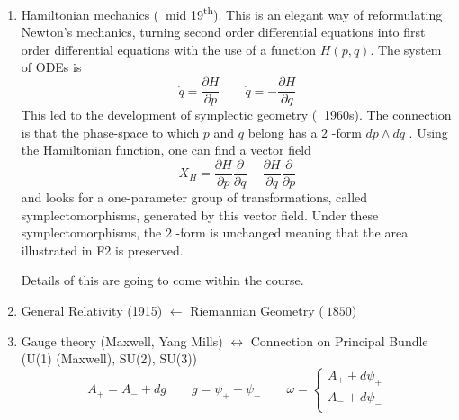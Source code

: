 \begin{enumerate}[1)]
  \item Hamiltonian mechanics ($~$ mid 19\textsuperscript{th}). This is an elegant way of reformulating Newton's mechanics, turning second order differential equations into first order differential equations with the use of a function $H(p, q)$. The system of ODEs is 
    \begin{equation}
      \dot{q} = \frac{\partial H}{\partial p} \qquad \dot{q} = - \frac{\partial H}{\partial q}
    \end{equation}
    This led to the development of symplectic geometry ($~$ 1960s).
    The connection is that the phase-space to which $p$  and $q$  belong has a $2$ -form $dp \wedge dq$ .
    Using the Hamiltonian function, one can find a vector field 
    \begin{equation}
      X_H = \frac{\partial H}{\partial p} \frac{\partial }{\partial q} - \frac{\partial H}{\partial q} \frac{\partial }{\partial p}
    \end{equation}
    and looks for a one-parameter group of transformations, called symplectomorphisms, generated by this vector field. Under these symplectomorphisms, the $2$ -form is unchanged meaning that the area illustrated in F2 is preserved.
    \begin{figure}[tbhp]
      \centering
      \def\svgwidth{0.4\columnwidth}
      
      \caption{}
      \label{fig:l1f2}
    \end{figure}
    Details of this are going to come within the course.
  \item General Relativity (1915) $\leftarrow$  Riemannian Geometry ($~1850$)
  \item Gauge theory (Maxwell, Yang Mills) $\leftrightarrow$  Connection on Principal Bundle (U(1) (Maxwell), SU(2), SU(3))
    \begin{equation}
      A_+ = A_- + d g \qquad g = \psi_+ - \psi_- \qquad 
      \omega = \left\{ 
	\begin{matrix}
	A_+ + d\psi_+ \\
	A_- + d\psi_- \\
	\end{matrix}
      \right.
    \end{equation}
    \begin{figure}[tbhp]
      \centering
      \def\svgwidth{0.4\columnwidth}
      
      \caption{}
      \label{fig:l1f3}
    \end{figure}
\end{enumerate}


